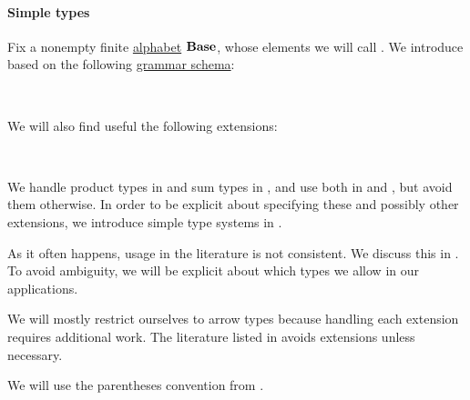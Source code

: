 \paragraph{Simple types}

\begin{definition}\label{def:simple_type}\mimprovised
  Fix a nonempty finite \hyperref[def:formal_language/alphabet]{alphabet} \( \op*{Base} \), whose elements we will call . We introduce  based on the following \hyperref[def:formal_grammar/schema]{grammar schema}:
  \begin{bnf*}
       {\bnftsq{(} \bnfsp {} \bnfsp \bnftsq{\( \synimplies \)} \bnfsp {} \bnfsp \bnftsq{)}} \\
             { \bnfor {}}
  \end{bnf*}

  We will also find useful the following extensions:
  \begin{bnf*}
     {\bnftsq{(} \bnfsp {} \bnfsp \bnftsq{\( \syntimes \)} \bnfsp {} \bnfsp \bnftsq{)}} \\
         {\bnftsq{(} \bnfsp {} \bnfsp \bnftsq{\( \synplus \)} \bnfsp {} \bnfsp \bnftsq{)}}
  \end{bnf*}

  We handle product types in  and sum types in , and use both in  and , but avoid them otherwise. In order to be explicit about specifying these and possibly other extensions, we introduce simple type systems in .
\end{definition}
\begin{comments}
  \item As it often happens, usage in the literature is not consistent. We discuss this in . To avoid ambiguity, we will be explicit about which types we allow in our applications.

  \item We will mostly restrict ourselves to arrow types because handling each extension requires additional work. The literature listed in  avoids extensions unless necessary.

  \item We will use the parentheses convention from .
\end{comments}

